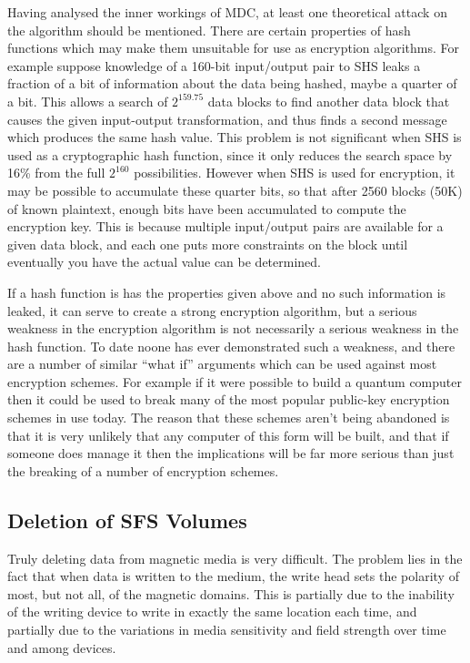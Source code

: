 Having analysed the inner workings of MDC, at least one theoretical attack on
the algorithm should be mentioned.  There are certain properties of hash
functions which may make them unsuitable for use as encryption algorithms.  For
example suppose knowledge of a 160-bit input/output pair to SHS leaks a
fraction of a bit of information about the data being hashed, maybe a quarter
of a bit.  This allows a search of $2^{159.75}$ data blocks to find another data
block that causes the given input-output transformation, and thus finds a
second message which produces the same hash value.  This problem is not
significant when SHS is used as a cryptographic hash function, since it only
reduces the search space by 16\% from the full $2^{160}$ possibilities.  However
when SHS is used for encryption, it may be possible to accumulate these quarter
bits, so that after 2560 blocks (50K) of known plaintext, enough bits have been
accumulated to compute the encryption key.  This is because multiple
input/output pairs are available for a given data block, and each one puts more
constraints on the block until eventually you have the actual value can be
determined.

If a hash function is has the properties given above and no such information is
leaked, it can serve to create a strong encryption algorithm, but a serious
weakness in the encryption algorithm is not necessarily a serious weakness in
the hash function.  To date noone has ever demonstrated such a weakness, and
there are a number of similar ``what if'' arguments which can be used against
most encryption schemes.  For example if it were possible to build a quantum
computer then it could be used to break many of the most popular public-key
encryption schemes in use today.  The reason that these schemes aren't being
abandoned is that it is very unlikely that any computer of this form will be
built, and that if someone does manage it then the implications will be far
more serious than just the breaking of a number of encryption schemes.



\subsection{Deletion of SFS Volumes}

Truly deleting data from magnetic media is very difficult.  The problem lies in
the fact that when data is written to the medium, the write head sets the
polarity of most, but not all, of the magnetic domains.  This is partially due
to the inability of the writing device to write in exactly the same location
each time, and partially due to the variations in media sensitivity and field
strength over time and among devices.


